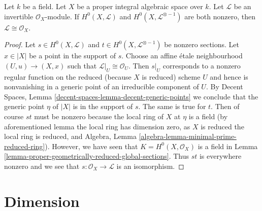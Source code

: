 \begin{lemma}
\label{lemma-characterize-trivial-pic-integral}
Let $k$ be a field. Let $X$ be a proper integral algebraic space over $k$.
Let $\mathcal{L}$ be an invertible $\mathcal{O}_X$-module.
If $H^0(X, \mathcal{L})$ and $H^0(X, \mathcal{L}^{\otimes - 1})$
are both nonzero, then $\mathcal{L} \cong \mathcal{O}_X$.
\end{lemma}

\begin{proof}
Let $s \in H^0(X, \mathcal{L})$ and $t \in H^0(X, \mathcal{L}^{\otimes - 1})$
be nonzero sections. Let $x \in |X|$ be a point in the support of $s$.
Choose an affine \'etale neighbourhood $(U, u) \to (X, x)$ such that
$\mathcal{L}|_U \cong \mathcal{O}_U$. Then $s|_U$ corresponds to a nonzero
regular function on the reduced (because $X$ is reduced) scheme $U$ and hence
is nonvanishing in a generic point of an irreducible component of $U$. By
Decent Spaces, Lemma \ref{decent-spaces-lemma-decent-generic-points}
we conclude that the generic point $\eta$ of $|X|$ is in the support of $s$.
The same is true for $t$. Then of course $st$ must be nonzero because
the local ring of $X$ at $\eta$ is a field (by aforementioned lemma
the local ring has dimension zero, as $X$ is reduced the local ring is
reduced, and Algebra, Lemma \ref{algebra-lemma-minimal-prime-reduced-ring}).
However, we have seen that $K = H^0(X, \mathcal{O}_X)$
is a field in Lemma \ref{lemma-proper-geometrically-reduced-global-sections}.
Thus $st$ is everywhere nonzero and we see that
$s : \mathcal{O}_X \to \mathcal{L}$ is an isomorphism.
\end{proof}






\section{Dimension}
\label{section-dimension}

